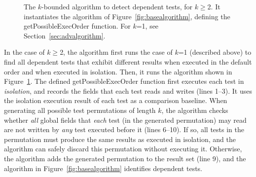 \begin{figure}[t]
\vspace{-3mm}
\caption {The \dependenceaware{} $k$-bounded algorithm to detect dependent tests,
  for $k$$\ge$2.
It instantiates the algorithm of Figure~\ref{fig:basealgorithm}, defining the
getPossibleExecOrder function.
For $k$=1, see Section~\ref{sec:advalgorithm}.
} 
\label{fig:impralg}
\end{figure}

In the case of $k$$\ge$2, the algorithm first runs the case of $k$=1 (described above)
to find all dependent tests that exhibit different results
when executed in the default order and when executed in isolation.
Then, it runs the algorithm shown in Figure~\ref{fig:impralg}.
%
The defined getPossibleExecOrder function first executes
each test in \textit{isolation}, and records the
fields that each test reads and writes (lines 1--3).
It uses the isolation execution result
of each test as a comparison baseline.
When generating all possible test permutations
of length $k$, the algorithm checks whether
\textit{all} global fields that \textit{each} test (in the generated permutation)
may read are not written by \textit{any} test executed before it (lines 6--10).
If so, all tests in the permutation
must produce the same results as executed in isolation,
and the algorithm can safely discard this permutation without
executing it. Otherwise, the algorithm adds the generated
permutation to the result set (line 9), and the algorithm in Figure~\ref{fig:basealgorithm}
identifies dependent tests. %

